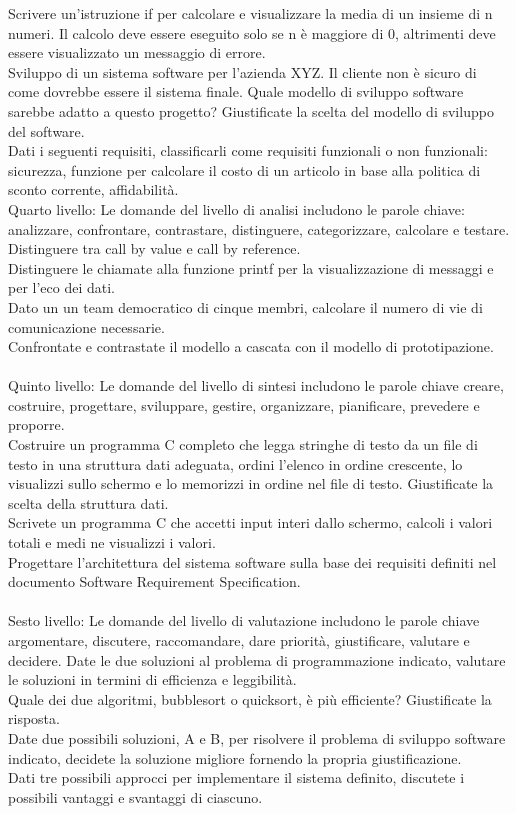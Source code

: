 \begin{itemize}
    Scrivere un'istruzione if per calcolare e visualizzare la media di un insieme di n numeri. Il calcolo deve essere eseguito solo se n è maggiore di 0, altrimenti deve essere visualizzato un messaggio di errore.\\
    Sviluppo di un sistema software per l'azienda XYZ. Il cliente non è sicuro di come dovrebbe essere il sistema finale. Quale modello di sviluppo software sarebbe adatto a questo progetto? Giustificate la scelta del modello di sviluppo del software.\\
    Dati i seguenti requisiti, classificarli come requisiti funzionali o non funzionali: sicurezza, funzione per calcolare il costo di un articolo in base alla politica di sconto corrente, affidabilità.\\
    Quarto livello: Le domande del livello di analisi includono le parole chiave: analizzare, confrontare, contrastare, distinguere, categorizzare, calcolare e testare.\\
    Distinguere tra call by value e call by reference.\\
    Distinguere le chiamate alla funzione printf per la visualizzazione di messaggi e per l'eco dei dati.\\
    Dato un un team democratico di cinque membri, calcolare il numero di vie di comunicazione necessarie.\\
    Confrontate e contrastate il modello a cascata con il modello di prototipazione.\\
    \\
    Quinto livello: Le domande del livello di sintesi includono le parole chiave creare, costruire, progettare, sviluppare, gestire, organizzare, pianificare, prevedere e proporre.\\
    Costruire un programma C completo che legga stringhe di testo da un file di testo in una struttura dati adeguata, ordini l'elenco in ordine crescente, lo visualizzi sullo schermo e lo memorizzi in ordine nel file di testo. Giustificate la scelta della struttura dati.\\
    Scrivete un programma C che accetti input interi dallo schermo, calcoli i valori totali e medi ne visualizzi i valori.\\
    Progettare l'architettura del sistema software sulla base dei requisiti definiti nel documento Software Requirement Specification.\\
    \\
    Sesto livello: Le domande del livello di valutazione includono le parole chiave argomentare, discutere, raccomandare, dare priorità, giustificare, valutare e decidere.
    Date le due soluzioni al problema di programmazione indicato, valutare le soluzioni in termini di efficienza e leggibilità.\\
    Quale dei due algoritmi, bubblesort o quicksort, è più efficiente? Giustificate la risposta.\\
    Date due possibili soluzioni, A e B, per risolvere il problema di sviluppo software indicato, decidete la soluzione migliore fornendo la propria giustificazione.\\
    Dati tre possibili approcci per implementare il sistema definito, discutete i possibili vantaggi e svantaggi di ciascuno.


\end{itemize}
